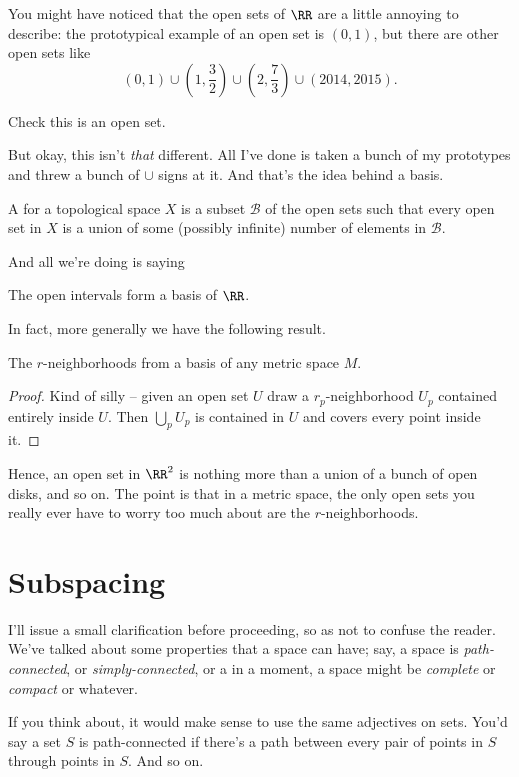 You might have noticed that the open sets of $\RR$ are a little annoying to describe: the prototypical example of an open set is $(0,1)$,
but there are other open sets like
\[
	(0,1)
	\cup \left( 1, \frac32 \right)
	\cup \left( 2, \frac 73 \right)
	\cup (2014, 2015). \]
\begin{ques}
	Check this is an open set.
\end{ques}

But okay, this isn't \emph{that} different.
All I've done is taken a bunch of my prototypes and threw a bunch of $\cup$ signs at it.
And that's the idea behind a basis.

\begin{definition}
	A  for a topological space $X$
	is a subset $\mathcal B$ of the open sets
	such that every open set in $X$
	is a union of some (possibly infinite) number of elements in
	$\mathcal B$.
\end{definition}

And all we're doing is saying
\begin{example}[Basis of $\RR$]
	The open intervals form a basis of $\RR$.
\end{example}
In fact, more generally we have the following result.
\begin{theorem}
	The $r$-neighborhoods from a basis of any metric space $M$.
\end{theorem}
\begin{proof}
	Kind of silly -- given an open set $U$
	draw a $r_p$-neighborhood $U_p$ contained entirely inside $U$.
	Then $\bigcup_p U_p$ is contained in $U$ and covers
	every point inside it.
\end{proof}

Hence, an open set in $\RR^2$ is nothing more than a union
of a bunch of open disks, and so on.
The point is that in a metric space, the only open sets you really
ever have to worry too much about are the $r$-neighborhoods.


\section{Subspacing}
I'll issue a small clarification before proceeding, so as not to confuse the reader.
We've talked about some properties that a space can have;
say, a space is \emph{path-connected}, or \emph{simply-connected},
or a in a moment, a space might be \emph{complete} or \emph{compact} or whatever.

If you think about, it would make sense to use the same adjectives on sets.
You'd say a set $S$ is path-connected if there's a path between every pair of points in $S$
through points in $S$. And so on.

